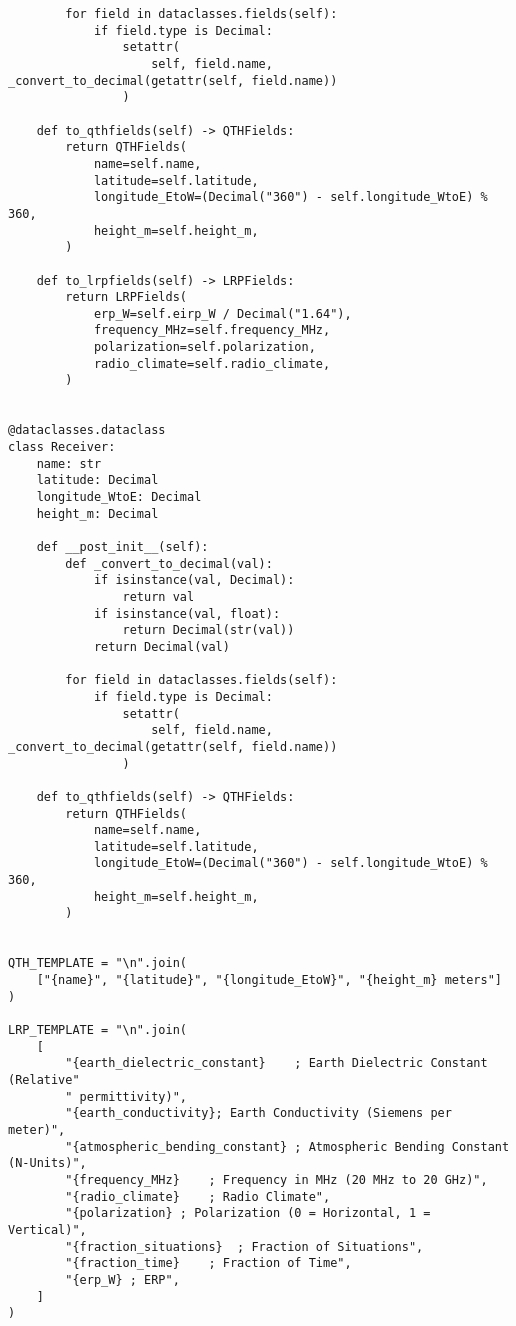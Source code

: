 \begin{verbatim}
        for field in dataclasses.fields(self):
            if field.type is Decimal:
                setattr(
                    self, field.name, _convert_to_decimal(getattr(self, field.name))
                )

    def to_qthfields(self) -> QTHFields:
        return QTHFields(
            name=self.name,
            latitude=self.latitude,
            longitude_EtoW=(Decimal("360") - self.longitude_WtoE) % 360,
            height_m=self.height_m,
        )

    def to_lrpfields(self) -> LRPFields:
        return LRPFields(
            erp_W=self.eirp_W / Decimal("1.64"),
            frequency_MHz=self.frequency_MHz,
            polarization=self.polarization,
            radio_climate=self.radio_climate,
        )


@dataclasses.dataclass
class Receiver:
    name: str
    latitude: Decimal
    longitude_WtoE: Decimal
    height_m: Decimal

    def __post_init__(self):
        def _convert_to_decimal(val):
            if isinstance(val, Decimal):
                return val
            if isinstance(val, float):
                return Decimal(str(val))
            return Decimal(val)

        for field in dataclasses.fields(self):
            if field.type is Decimal:
                setattr(
                    self, field.name, _convert_to_decimal(getattr(self, field.name))
                )

    def to_qthfields(self) -> QTHFields:
        return QTHFields(
            name=self.name,
            latitude=self.latitude,
            longitude_EtoW=(Decimal("360") - self.longitude_WtoE) % 360,
            height_m=self.height_m,
        )


QTH_TEMPLATE = "\n".join(
    ["{name}", "{latitude}", "{longitude_EtoW}", "{height_m} meters"]
)

LRP_TEMPLATE = "\n".join(
    [
        "{earth_dielectric_constant}	; Earth Dielectric Constant (Relative"
        " permittivity)",
        "{earth_conductivity}; Earth Conductivity (Siemens per meter)",
        "{atmospheric_bending_constant}	; Atmospheric Bending Constant (N-Units)",
        "{frequency_MHz}	; Frequency in MHz (20 MHz to 20 GHz)",
        "{radio_climate}	; Radio Climate",
        "{polarization}	; Polarization (0 = Horizontal, 1 = Vertical)",
        "{fraction_situations}	; Fraction of Situations",
        "{fraction_time}	; Fraction of Time",
        "{erp_W} ; ERP",
    ]
)


\end{verbatim}
